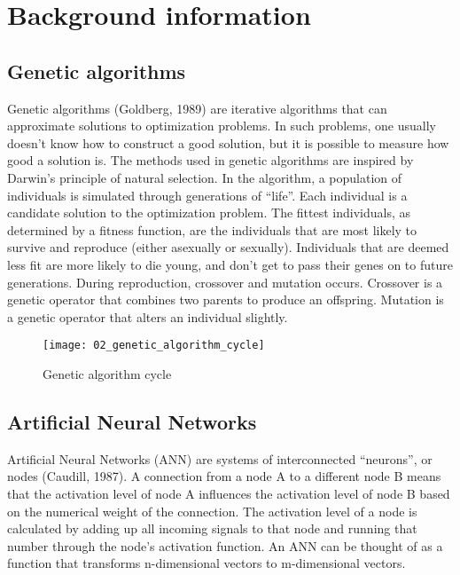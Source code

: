 \chapter{Background information}

\section{Genetic algorithms}
Genetic algorithms (Goldberg, 1989) are iterative algorithms that can approximate solutions to optimization problems. In such problems, one usually doesn’t know how to construct a good solution, but it is possible to measure how good a solution is. The methods used in genetic algorithms are inspired by Darwin's principle of natural selection. In the algorithm, a population of individuals is simulated through generations of “life”. Each individual is a candidate solution to the optimization problem. The fittest individuals, as determined by a fitness function, are the individuals that are most likely to survive and reproduce (either asexually or sexually). Individuals that are deemed less fit are more likely to die young, and don’t get to pass their genes on to future generations. During reproduction, crossover and mutation occurs. Crossover is a genetic operator that combines two parents to produce an offspring. Mutation is a genetic operator that alters an individual slightly.

\begin{figure}[h]
    \centering
    \texttt{[image: 02\_genetic\_algorithm\_cycle]}
    \caption{Genetic algorithm cycle}
    \label{fig:genetic_algorithm_cycle}
\end{figure}

\section{Artificial Neural Networks}
Artificial Neural Networks (ANN) are systems of interconnected “neurons”, or nodes (Caudill, 1987). A connection from a node A to a different node B means that the activation level of node A influences the activation level of node B based on the numerical weight of the connection. The activation level of a node is calculated by adding up all incoming signals to that node and running that number through the node’s activation function. An ANN can be thought of as a function that transforms n-dimensional vectors to m-dimensional vectors.

